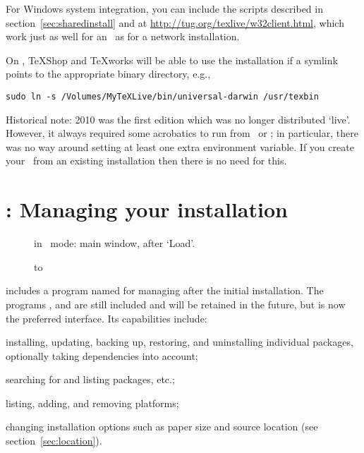 \documentclass{article}
\begin{document}
For Windows system integration, you can include the 
scripts described in section~\ref{sec:sharedinstall} and at
\url{http://tug.org/texlive/w32client.html}, which work just as well for
an \ISO\ as for a network installation.

On \MacOSX, TeXShop and \TeX{}works will be able to use the 
installation if a symlink  points to the
appropriate binary directory, e.g.,
\begin{verbatim}
sudo ln -s /Volumes/MyTeXLive/bin/universal-darwin /usr/texbin
\end{verbatim}

Historical note: \TL{} 2010 was the first \TL{} edition which was no
longer distributed `live'.  However, it always required some acrobatics
to run from \DVD\ or \ISO; in particular, there was no way around
setting at least one extra environment variable.  If you create your
\ISO\ from an existing installation then there is no need for this.


\section{: Managing your installation}
\label{sec:tlmgr}

\begin{figure}[tb]
\caption{ in \GUI\ mode: main window, after `Load'.}
\label{fig:tlmgr-gui}
\end{figure}

\begin{figure}[tb]
\hbox to 
\end{figure}

\TL{} includes a program named  for managing \TL{} after the
initial installation.  The programs ,  and
 are still included and will be retained in the future,
but  is now the preferred interface.  Its capabilities
include:

\begin{itemize*}
\item installing, updating, backing up, restoring, and uninstalling
  individual packages, optionally taking dependencies into account;
\item searching for and listing packages, etc.;
\item listing, adding, and removing platforms;
\item changing installation options such as paper size and source
  location (see section~\ref{sec:location}).
\end{itemize*}
\end{document}
